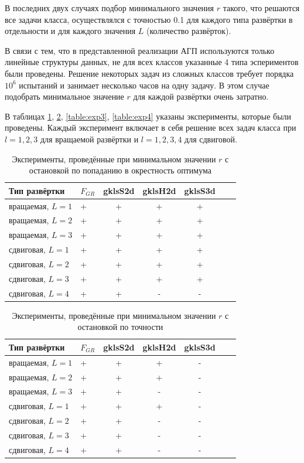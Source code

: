 \documentclass[a4paper]{article}
\begin{document}
В последних двух случаях подбор минимального значения $r$ такого, что решаются все задачи класса, осуществлялся с точностью 0.1 для каждого типа
развёртки в отдельности и для каждого значения $L$ (количество развёрток).

В связи с тем, что в представленной реализации АГП используются только линейные структуры данных, не для всех классов указанные 4 типа эспериментов были проведены. Решение некоторых задач из сложных классов требует порядка $10^6$ испытаний и занимает несколько часов на одну задачу. В этом случае подобрать минимальное значение $r$ для каждой развёртки очень затратно.

В таблицах \ref{table:exp1}, \ref{table:exp2}, \ref{table:exp3}, \ref{table:exp4} указаны эксперименты, которые были проведены. Каждый эксперимент включает в себя решение всех задач класса при $l=1,2,3$ для вращаемой развёртки и $l=1,2,3,4$ для сдвиговой.

\begin{table}
\begin{center}
\caption{Эксперименты, проведённые при минимальном значении $r$ с остановкой по попаданию в окрестность оптимума}
  \begin{tabular}{l|l*{4}{c}r}
    \label{table:exp1}
  Тип развёртки & $F_{GR}$ & gklsS2d & gklsH2d & gklsS3d \\
  \hline
  вращаемая, $L=1$ & + & + & + & + \\
  вращаемая, $L=2$ & + & + & + & + \\
  вращаемая, $L=3$ & + & + & + & + \\
  сдвиговая, $L=1$ & + & + & + & + \\
  сдвиговая, $L=2$ & + & + & + & + \\
  сдвиговая, $L=3$ & + & + & + & + \\
  сдвиговая, $L=4$ & + & + & - & - \\
  \end{tabular}
\end{center}
\end{table}

\begin{table}
\begin{center}
\caption{Эксперименты, проведённые при минимальном значении $r$ с остановкой по точности}
  \begin{tabular}{l|l*{4}{c}r}
    \label{table:exp2}
  Тип развёртки & $F_{GR}$ & gklsS2d & gklsH2d & gklsS3d \\
  \hline
  вращаемая, $L=1$ & + & + & + & - \\
  вращаемая, $L=2$ & + & + & + & - \\
  вращаемая, $L=3$ & + & + & - & - \\
  сдвиговая, $L=1$ & + & + & + & - \\
  сдвиговая, $L=2$ & + & + & - & - \\
  сдвиговая, $L=3$ & + & + & - & - \\
  сдвиговая, $L=4$ & + & + & - & - \\
  \end{tabular}
\end{center}
\end{table}
\end{document}
